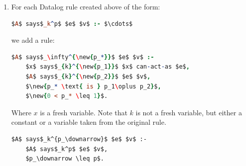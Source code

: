 \documentclass[thesis.tex]{subfiles}
\begin{document}
\begin{enumerate}
  \item
    For each Datalog rule created above of the form:
    \begin{lstlisting}[language=Prolog]
      $A$ says$_k^p$ $e$ $v$ :- $\cdots$
    \end{lstlisting}
    we add a rule:

    \begin{lstlisting}[language=Prolog]
$A$ says$_\infty^{\new{p_*}}$ $e$ $v$ :-
    $x$ says$_{k}^{\new{p_1}}$ $x$ can-act-as $e$,
    $A$ says$_{k}^{\new{p_2}}$ $e$ $v$,
    $\new{p_* \text{ is } p_1\oplus p_2}$, 
    $\new{0 < p_* \leq 1}$.
    \end{lstlisting} Where $x$ is a fresh variable.  Note that $k$ is
not a fresh variable, but either a constant or a variable taken from
the original rule.
    

      
      \begin{lstlisting}[basicstyle=\color{BrickRed}\ttfamily]
$A$ says$_k^{p_\downarrow}$ $e$ $v$ :- 
    $A$ says$_k^p$ $e$ $v$,
    $p_\downarrow \leq p$.
      \end{lstlisting}
\end{enumerate}
\end{document}

